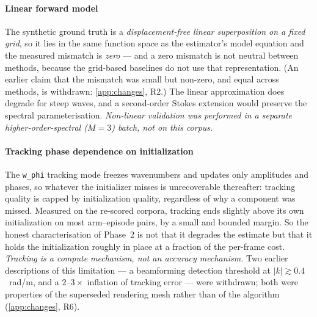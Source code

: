 \documentclass[review]{elsarticle}
\begin{document}
\paragraph{Linear forward model}
The synthetic ground truth is a \emph{displacement-free linear superposition on a
fixed grid}, so it lies in the same function space as the estimator's model equation
and the measured mismatch is \emph{zero} --- and a zero mismatch is not neutral
between methods, because the grid-based baselines do not use that representation.
(An earlier claim that the mismatch was small but non-zero, and equal across methods,
is withdrawn: \ref{app:changes}, R2.) The linear approximation does
degrade for steep waves, and a second-order Stokes extension would preserve the
spectral parameterisation. \emph{Non-linear validation was performed in a separate
higher-order-spectral ($M{=}3$) batch, not on this corpus.}

\paragraph{Tracking phase dependence on initialization}
The \texttt{w\_phi} tracking mode freezes wavenumbers and updates only amplitudes
and phases, so whatever the initializer misses is unrecoverable thereafter: tracking
quality is capped by initialization quality, regardless of why a component was
missed. Measured on the re-scored corpora, tracking ends slightly above its own
initialization on most arm--episode pairs, by a small and bounded margin. So the
honest characterisation of Phase~2 is not that it degrades the estimate but that it
holds the initialization roughly in place at a fraction of the per-frame cost.
\emph{Tracking is a compute mechanism, not an accuracy mechanism.} Two earlier
descriptions of this limitation --- a beamforming detection threshold at
$|k|\gtrsim 0.4$~rad/m, and a $2$--$3\times$ inflation of tracking error --- were
withdrawn; both were properties of the superseded rendering mesh rather than of the
algorithm (\ref{app:changes}, R6).
\end{document}
